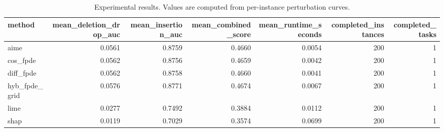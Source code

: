 \begin{table}[t]
\caption{Experimental results. Values are computed from per-instance perturbation curves.}
\label{tab:main_results_computed}
\centering
\begin{tabular}{lrrrrrr}
\toprule
method & mean\_deletion\_drop\_auc & mean\_insertion\_auc & mean\_combined\_score & mean\_runtime\_seconds & completed\_instances & completed\_tasks \\
\midrule
aime & 0.0561 & 0.8759 & 0.4660 & 0.0054 & 200 & 1 \\
cos\_fpde & 0.0562 & 0.8756 & 0.4659 & 0.0042 & 200 & 1 \\
diff\_fpde & 0.0562 & 0.8758 & 0.4660 & 0.0041 & 200 & 1 \\
hyb\_fpde\_grid & 0.0576 & 0.8771 & 0.4674 & 0.0067 & 200 & 1 \\
lime & 0.0277 & 0.7492 & 0.3884 & 0.0112 & 200 & 1 \\
shap & 0.0119 & 0.7029 & 0.3574 & 0.0699 & 200 & 1 \\
\bottomrule
\end{tabular}

\end{table}
